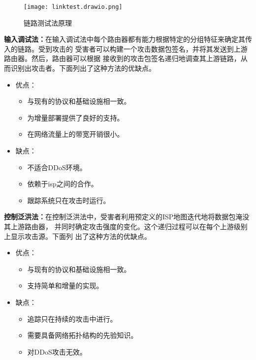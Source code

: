 \begin{figure}[htbp]
  \centering
  \texttt{[image: linktest.drawio.png]}
  \caption{链路测试法原理}
  \label{fig:linktest}
\end{figure}

\textbf{输入调试法：}在输入调试法中每个路由器都有能力根据特定的分组特征来确定其传入的链路。受到攻击的
受害者可以构建一个攻击数据包签名，并将其发送到上游路由器。然后，路由器可以根据
接收到的攻击包签名递归地调查其上游链路，从而识别出攻击者。下面列出了这种方法的优缺点。
\begin{itemize}
  \item 优点：
    \begin{itemize}
    \item 与现有的协议和基础设施相一致。
    \item 为增量部署提供了良好的支持。
    \item 在网络流量上的带宽开销很小。
  \end{itemize}
\item 缺点：
  \begin{itemize}
    \item 不适合DDoS环境。
    \item 依赖于isp之间的合作。
    \item 跟踪系统只在攻击时运行。
  \end{itemize}
\end{itemize}

\textbf{控制泛洪法：}在控制泛洪法中，受害者利用预定义的ISP地图迭代地将数据包淹没其上游路由器，
并同时确定攻击强度的变化。这个递归过程可以在每个上游级别上显示攻击源。下面列
出了这种方法的优缺点。
\begin{itemize}
  \item 优点：
    \begin{itemize}
      \item 与现有的协议和基础设施相一致。
      \item 支持简单和增量的实现。
    \end{itemize}
  \item 缺点：
    \begin{itemize}
      \item 追踪只在持续的攻击中进行。
      \item 需要具备网络拓扑结构的先验知识。
      \item 对DDoS攻击无效。
    \end{itemize}
\end{itemize}

